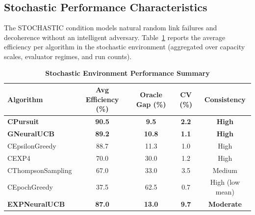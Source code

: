 \documentclass[12pt,a4paper]{article}
\newcommand{\stochastic}[1]{\textcolor{stochasticcolor}{\textbf{#1}}}
\newcommand{\legacy}[1]{\textcolor{legacycolor}{\textbf{#1}}}
\newcommand{\neural}[1]{\textcolor{neuralcolor}{\textbf{#1}}}
\begin{document}
\begin{tcolorbox}[colback=stochasticcolor!10,colframe=stochasticcolor,title=\textbf{Stochastic Environment Deep Analysis (1$\times$–2$\times$ Capacities, T/Tb Combined)}]

\subsection{Stochastic Performance Characteristics}

The STOCHASTIC condition models natural random link failures and decoherence without an intelligent adversary. Table~\ref{tab:stoch-performance} reports the average efficiency per algorithm in the stochastic environment (aggregated over capacity scales, evaluator regimes, and run counts).

\begin{table}[H]
\centering
\caption{\stochastic{Stochastic Environment Performance Summary}}
\label{tab:stoch-performance}
\begin{tabular}{|l|c|c|c|c|}
\hline
\textbf{Algorithm} & \textbf{Avg Efficiency (\%)} & \textbf{Oracle Gap (\%)} & \textbf{CV (\%)} & \textbf{Consistency} \\
\hline
\hline
\stochastic{CPursuit}        & \stochastic{\textbf{90.5}} & \stochastic{9.5}  & \stochastic{2.2} & \stochastic{High} \\
\neural{GNeuralUCB}          & \neural{\textbf{89.2}} & \neural{10.8}     & \neural{1.1} & \neural{High} \\
CEpsilonGreedy               & 88.7                        & 11.3              & 1.0              & High \\
CEXP4                        & 70.0                        & 30.0              & 1.2              & High \\
CThompsonSampling            & 67.0                        & 33.0              & 3.5              & Medium \\
CEpochGreedy                 & 37.5                        & 62.5              & 0.7              & High (low mean) \\
\legacy{EXPNeuralUCB}        & \legacy{87.0}               & \legacy{13.0}     & \legacy{9.7}     & \legacy{Moderate} \\
\hline
\end{tabular}
\end{table}


\end{tcolorbox}
\end{document}
